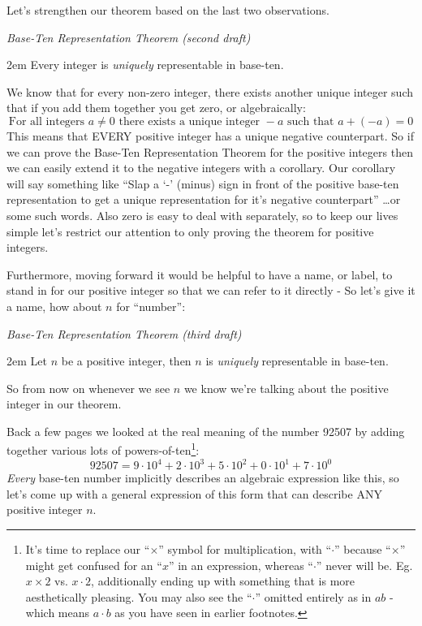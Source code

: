 \documentclass{article}
\newenvironment{jprIn}{\begin{adjustwidth}{2em}{}}{\end{adjustwidth}}
\begin{document}
Let's strengthen our theorem based on the last two observations.

\emph{Base-Ten Representation Theorem (second draft)}
\begin{jprIn}
Every integer is \emph{uniquely} representable in base-ten.
\end{jprIn}

We know that for every non-zero integer,
there exists another unique integer
such that if you add them together you get zero, or algebraically:
\[\text{For all integers }a\ne0\text{ there exists a unique integer }{-}a\text{ such that }a+(-a)=0\]
This means that EVERY positive integer has a unique negative counterpart.
So if we can prove the
Base-Ten Representation Theorem for the positive integers then we
can easily extend it to the negative integers with a corollary.
Our corollary will say something like ``Slap a `-' (minus) sign in front of the positive base-ten representation to 
get a unique representation for
it's negative counterpart'' \dots{}or some such words.  Also zero is easy to deal with separately, so to keep our lives
simple let's restrict our attention to only proving the theorem for positive integers.

Furthermore, moving forward it would be helpful to have a name, or label, to stand in for our 
positive integer so that we can refer to it directly -
So let's give it a name, how about $n$ for ``number'':

\emph{Base-Ten Representation Theorem (third draft)}
\begin{jprIn}
Let $n$ be a positive integer, then $n$ is \emph{uniquely} representable in base-ten.
\end{jprIn}

So from now on whenever we see $n$ we know we're talking about the positive integer in our theorem.

Back a few pages we looked at the real meaning of the number 92507 by adding together
various lots of powers-of-ten\footnote{It's time to replace our ``$\times{}$'' symbol for multiplication, with ``$\cdot{}$''
because ``$\times{}$'' might get confused for an ``$x$'' in an expression,
whereas ``$\cdot{}$'' never will be. Eg. $x\times{}2$ vs. $x\cdot{}2$, additionally ending up with something that is more aesthetically pleasing.
You may also see the ``$\cdot$'' omitted entirely as in $ab$ - which means $a\cdot{}b$ as you have seen in earlier footnotes.}:
\[92507=9{\cdot}10^4+2{\cdot}10^3+5{\cdot}10^2+0{\cdot}10^1+7{\cdot}10^0\]
\emph{Every} base-ten number implicitly describes an algebraic expression like this, so
let's come up
with a general expression of this form that can describe ANY positive integer $n$.
\end{document}
